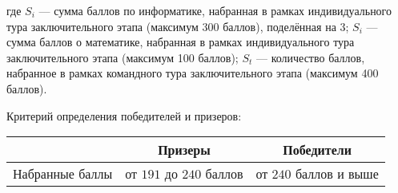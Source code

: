 где $S_i$ --- сумма баллов по информатике, набранная в рамках индивидуального
тура заключительного этапа (максимум 300 баллов), поделённая на 3; $S_i$ ---
сумма баллов о математике, набранная в рамках индивидуального тура
заключительного этапа (максимум 100 баллов); $S_t$ --- количество баллов,
набранное в рамках командного тура заключительного этапа (максимум
400 баллов).

Критерий определения победителей и призеров:

\begin{center}
\begin{tabular}{ |c|c|c| }
 \hline
  & \textbf{Призеры} & \textbf{Победители} \\
 \hline
 Набранные баллы & от $191$ до $240$ баллов & от $240$ баллов и выше \\
 \hline
\end{tabular}
\end{center}
